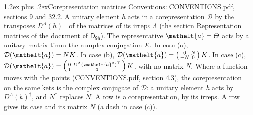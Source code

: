 \documentclass[10pt,a4paper]{article}
\makeatletter
\renewcommand\section{\@startsection{section}{1}{\z@}{-3ex plus -1ex minus -.2ex}%
  {1.2ex plus .2ex}{\normalfont\large\sffamily\bfseries\color{parttitle}}}
\numberwithin{equation}{section}
\newcommand{\eltfont}[1]{{\let\sigma\eltsigma\mathelt{#1}}}
\newcommand{\grp}[1]{\mathsf{#1}}
\newcommand{\elt}[1]{\eltfont{#1}}
\makeatother
\begin{document}
\section{Corepresentation matrices}\label{s:corep_matrices}
Conventions: \href{../../CONVENTIONS.pdf}{CONVENTIONS.pdf}, sections \href{../../../rotation/CONVENTIONS.pdf\#conv.9}{9} and \href{../../CONVENTIONS.pdf\#conv.32.2}{32.2}.
A unitary element $h$ acts in a corepresentation $\mathcal{D}$ by the transposes $D^{\Lambda}(h)^{\top}$ of the matrices of its irreps $\Lambda$ (the section Representation matrices of the document of \href{../../../rotation/data/pdf/D9h.pdf}{$\grp{D_{9h}}$}). The representative $\elt{a} = \varTheta$ acts by a unitary matrix times the complex conjugation $K$.
In case (a), $\mathcal{D}(\elt{a}) = NK$. In case (b), $\mathcal{D}(\elt{a}) = \left(\begin{smallmatrix} 0 & N \\ -N & 0 \end{smallmatrix}\right) K$. In case (c), $\mathcal{D}(\elt{a}) = \left(\begin{smallmatrix} 0 & D^{\Lambda}(\elt{a}^2)^{\top} \\ 1 & 0 \end{smallmatrix}\right) K$, with no matrix $N$.
Where a function moves with the points (\href{../../CONVENTIONS.pdf}{CONVENTIONS.pdf}, section \href{../../../rotation/CONVENTIONS.pdf\#conv.4.3}{4.3}), the corepresentation on the same kets is the complex conjugate of $\mathcal{D}$: a unitary element $h$ acts by $D^{\Lambda}(h)^{\dagger}$, and $N^{*}$ replaces $N$.
A row is a corepresentation, by its irreps. A row gives its case and its matrix $N$ (a dash in case (c)).
\end{document}
